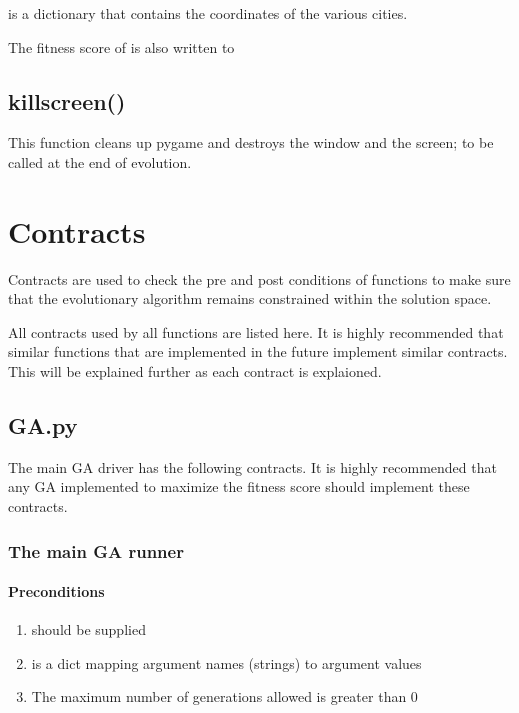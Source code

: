 \documentclass[letterpaper,10pt,english]{sphinxmanual}
\begin{document}
 is a dictionary that contains the coordinates of the various cities.

The fitness score of  is also written to 


\section{killscreen()}
\label{visualization.py:killscreen}
This function cleans up pygame and destroys the window and the screen; to be called at the end of evolution.


\chapter{Contracts}
\label{contracts:contracts}\label{contracts::doc}
Contracts are used to check the pre and post conditions of functions to make sure that the evolutionary algorithm remains constrained within the solution space.

All contracts used by all functions are listed here. It is highly recommended that similar functions that are implemented in the future implement similar contracts. This will be explained further as each contract is explaioned.


\section{GA.py}
\label{contracts:ga-py}
The main GA driver has the following contracts. It is highly recommended that any GA implemented to maximize the fitness score should implement these contracts.


\subsection{The main GA runner}
\label{contracts:the-main-ga-runner}

\subsubsection{Preconditions}
\label{contracts:preconditions}\begin{enumerate}
\item {} 
 should be supplied

\item {} 
 is a dict mapping argument names (strings) to argument values

\item {} 
The maximum number of generations allowed is greater than 0

\end{enumerate}
\end{document}
